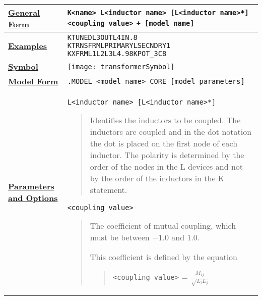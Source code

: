 


\small
\begin{longtable}[Hh]{>{\setlength{\hsize}{.2\hsize}}YY} \hline

\underline{\bf General Form} &
\verb|K<name> L<inductor name> [L<inductor name>*] <coupling value>|
\verb|+ [model name] | \\ \hline

\underline{\bf Examples} &
\begin{alltt}
KTUNED L3OUT  L4IN .8
KTRNSFRM LPRIMARY LSECNDRY 1
KXFRM L1 L2  L3  L4 .98 KPOT\_3C8
\end{alltt} \\ \hline

\underline{\bf Symbol} &
{\texttt{[image: transformerSymbol]}}
\\ \hline

\underline{\bf Model Form} &
\verb|.MODEL <model name> CORE [model parameters]| \\ \hline

\underline{\bf Parameters} \underline{\bf and Options} &
\texttt{L<inductor name> [L<inductor name>*]}
\begin{quote}
  Identifies the inductors to be coupled. The inductors are coupled and in
  the dot notation the dot is placed on the first node of each inductor. The
  polarity is determined by the order of the nodes in the L devices and not by
  the order of the inductors in the K statement.
\end{quote}
\texttt{<coupling value>}
\begin{quote}
  The coefficient of mutual coupling, which must be between $-1.0$
  and $1.0$.

  This coefficient is defined by the equation
  \begin{quote}
    \texttt{<coupling value>} = $\frac{M_{ij}}{\sqrt{L_iL_j}}$
  \end {quote}


\end{quote}
\end{longtable}
